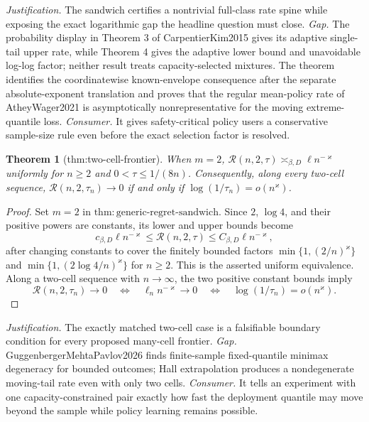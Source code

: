 \documentclass{article}
\newtheorem{theorem}{Theorem}
\begin{document}
\par\smallskip\noindent \textit{Justification.} The sandwich certifies a nontrivial full-class rate spine while exposing the exact logarithmic gap the headline question must close. \textit{Gap.} The probability display in Theorem 3 of CarpentierKim2015 gives its adaptive single-tail upper rate, while Theorem 4 gives the adaptive lower bound and unavoidable log-log factor; neither result treats capacity-selected mixtures. The theorem identifies the coordinatewise known-envelope consequence after the separate absolute-exponent translation and proves that the regular mean-policy rate of AtheyWager2021 is asymptotically nonrepresentative for the moving extreme-quantile loss. \textit{Consumer.} It gives safety-critical policy users a conservative sample-size rule even before the exact selection factor is resolved.

\begin{theorem}[thm:two-cell-frontier]\label{thm:two-cell-frontier}
When \(m=2\), \(\mathcal R(n,2,\tau)\asymp_{\beta,D}\ell n^{-\varkappa}\) uniformly for \(n\ge2\) and \(0<\tau\le1/(8n)\). Consequently, along every two-cell sequence, \(\mathcal R(n,2,\tau_n)\to0\) if and only if \(\log(1/\tau_n)=o(n^{\varkappa})\).
\end{theorem}
\begin{proof}
Set \(m=2\) in \(\mathrm{thm{:}generic\text{-}regret\text{-}sandwich}\).  Since \(2\), \(\log4\), and their positive powers are constants, its lower and upper bounds become
\[
c_{\beta,D}\ell n^{-\varkappa}
\leq\mathcal R(n,2,\tau)
\leq C_{\beta,D}\ell n^{-\varkappa},
\]
after changing constants to cover the finitely bounded factors \(\min\{1,(2/n)^\varkappa\}\) and \(\min\{1,(2\log4/n)^\varkappa\}\) for \(n\geq2\).  This is the asserted uniform equivalence.  Along a two-cell sequence with \(n\to\infty\), the two positive constant bounds imply
\[
\mathcal R(n,2,\tau_n)\to0
\quad\Longleftrightarrow\quad
\ell_n n^{-\varkappa}\to0
\quad\Longleftrightarrow\quad
\log(1/\tau_n)=o(n^\varkappa).
\]
\end{proof}
\par\smallskip\noindent \textit{Justification.} The exactly matched two-cell case is a falsifiable boundary condition for every proposed many-cell frontier. \textit{Gap.} GuggenbergerMehtaPavlov2026 finds finite-sample fixed-quantile minimax degeneracy for bounded outcomes; Hall extrapolation produces a nondegenerate moving-tail rate even with only two cells. \textit{Consumer.} It tells an experiment with one capacity-constrained pair exactly how fast the deployment quantile may move beyond the sample while policy learning remains possible.
\end{document}
